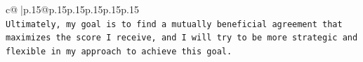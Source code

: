 \documentclass{article}
\begin{document}
{\begin{supertabular}{c@{$\;$}|p{.15\linewidth}@{}p{.15\linewidth}p{.15\linewidth}p{.15\linewidth}p{.15\linewidth}p{.15\linewidth}}
{{{\\ 
\texttt{Ultimately, my goal is to find a mutually beneficial agreement that maximizes the score I receive, and I will try to be more strategic and flexible in my approach to achieve this goal.} \\
            }
        }
    }
     \\ \\

\end{supertabular}
}
\end{document}
